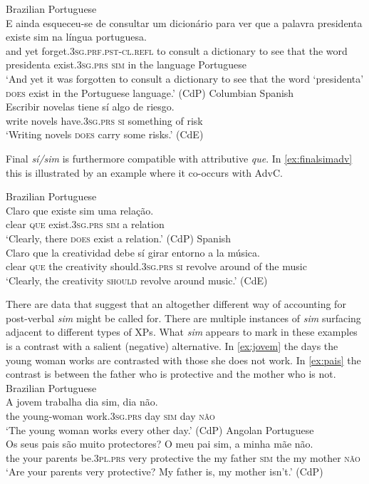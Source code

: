 \ea\label{ex:adjasim}
\ea Brazilian Portuguese\\ \gll E ainda esqueceu-se de consultar um dicionário para ver que a palavra presidenta existe sim na língua portuguesa. \\
and yet forget.\textsc{3sg.prf.pst}-\textsc{cl.refl} to consult a dictionary to see that the word presidenta exist.\textsc{3sg.prs} \textsc{sim} {in the} language Portuguese\\
\glt `And yet it was forgotten to consult a dictionary to see that the word `presidenta' \textsc{does} exist in the Portuguese language.'  (CdP) 
 \ex Columbian Spanish \\ \gll  Escribir novelas tiene sí algo de riesgo. \\
 write novels have.\textsc{3sg.prs} \textsc{si} something of risk\\
 \glt `Writing novels \textsc{does} carry some risks.' (CdE)
\z
\z


Final \emph{sí/sim} is furthermore compatible with attributive \emph{que}. In \eqref{ex:finalsimadv} this is illustrated by  an example where it co-occurs with AdvC.\largerpage[2]

\ea\label{ex:finalsimadv}
\ea Brazilian Portuguese \\ \gll  Claro que existe sim uma relação.\\
clear \textsc{que} exist.\textsc{3sg.prs} \textsc{sim} a relation\\
\glt `Clearly, there \textsc{does} exist a relation.'  (CdP) 
\ex Spanish \\ \gll  Claro que la creatividad debe sí girar entorno a la música. \\
clear \textsc{que} the creativity should.\textsc{3sg.prs} \textsc{si} revolve around of the music\\
\glt `Clearly, the creativity \textsc{should} revolve around music.' (CdE)
\z
\z


 
There are data that suggest that an altogether different way of accounting for post-verbal \emph{sim} might be called for. There are multiple instances of  \emph{sim} surfacing adjacent to different types of XPs. What \emph{sim} appears to mark in these examples is a contrast with a salient (negative) alternative. In \eqref{ex:jovem} the days the young woman works are contrasted with those she does not work. In \eqref{ex:pais} the contrast is between the father who is protective and the mother who is not.
\ea
\ea\label{ex:jovem} Brazilian Portuguese\\
\gll 
A jovem trabalha dia sim, dia não. \\
the young-woman work.\textsc{3sg.prs} day \textsc{sim} day \textsc{n\~ao}\\
\glt `The young woman works every other day.' (CdP)
\ex\label{ex:pais} Angolan Portuguese\\
\gll Os seus pais são muito protectores? O meu pai sim, a minha mãe não.\\
the your parents be.\textsc{3pl.prs} very protective the my father \textsc{sim} the my mother \textsc{n\~ao}\\
\glt `Are your parents very protective? My father is, my mother isn't.' (CdP)
\z 
\z 

